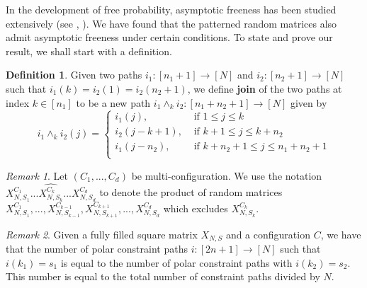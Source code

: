 \documentclass[12pt]{amsart}
\theoremstyle{definition}
\newtheorem{defn}{Definition}[section]
\theoremstyle{remark}
\newtheorem{remark}{Remark}
\begin{document}
\vspace{5 pt}

In the development of free probability, asymptotic freeness has been studied extensively (see \cite{voiculescu1995free}, \cite{mingo2016freeness}). We have found that the patterned random matrices also admit asymptotic freeness under certain conditions. To state and prove our result, we shall start with a definition. \par


\begin{defn}
Given two paths $i_1:[n_1+1] \to [N]$ and $i_2:[n_2+1] \to [N]$ such that $i_1(k)=i_2(1)=i_2(n_2+1)$, we define \textbf{join} of the two paths at index $k \in [n_1]$ to be a new path $i_1 \wedge_k i_2: [n_1+n_2+1] \to [N]$ given by 
\begin{equation*}
   i_1 \wedge_k i_2(j) =
    \begin{cases}
      i_1(j), &  \text{ if } 1 \leq j \leq k \\
      i_2(j-k+1),  &  \text{ if } k+1 \leq j \leq k+n_2 \\
      i_1(j-n_2),  & \text{ if }  k+n_2+1 \leq j \leq n_1+n_2+1 \\
    \end{cases}
  \end{equation*}
\end{defn}



\begin{remark}
Let $(C_1,...,C_d)$ be multi-configuration. We use the notation $X_{N,S_1}^{C_1}...\widehat{X_{N,S_k}^{C_k}}...X_{N,S_d}^{C_d}$ to denote the product of random matrices $X_{N,S_1}^{C_1},...,X_{N,S_{k-1}}^{C_{k-1}},X_{N,S_{k+1}}^{C_{k+1}},...,X_{N,S_d}^{C_d}$ which excludes $X_{N,S_k}^{C_k}$.
\end{remark}




\begin{remark}\label{rem6}
Given a fully filled square matrix $X_{N,S}$ and a configuration $C$, we have that the number of polar constraint paths $i:[2n+1] \to [N]$ such that $i(k_1)=s_1$ is equal to the number of polar constraint paths with $i(k_2)=s_2$. This number is equal to the total number of constraint paths divided by $N$.
\end{remark}
\end{document}
